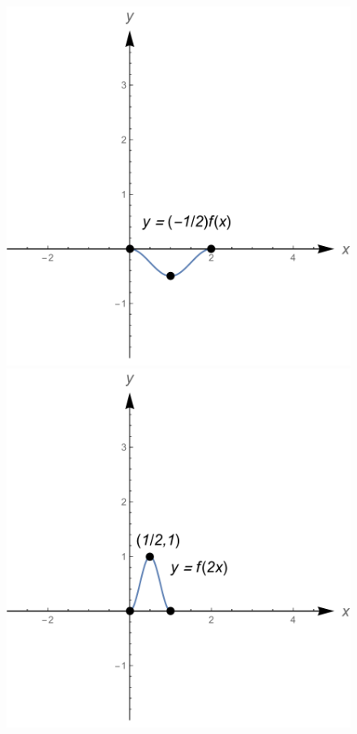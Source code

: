 \begin{Answer}
    \begin{figure}[H]
        \centerline{
        \includegraphics[scale=0.3]{fig_functions_oef_8i}
        \hspace{0.1cm}
        \includegraphics[scale=0.3]{fig_functions_oef_8j}
}
\end{figure}
\end{Answer}
